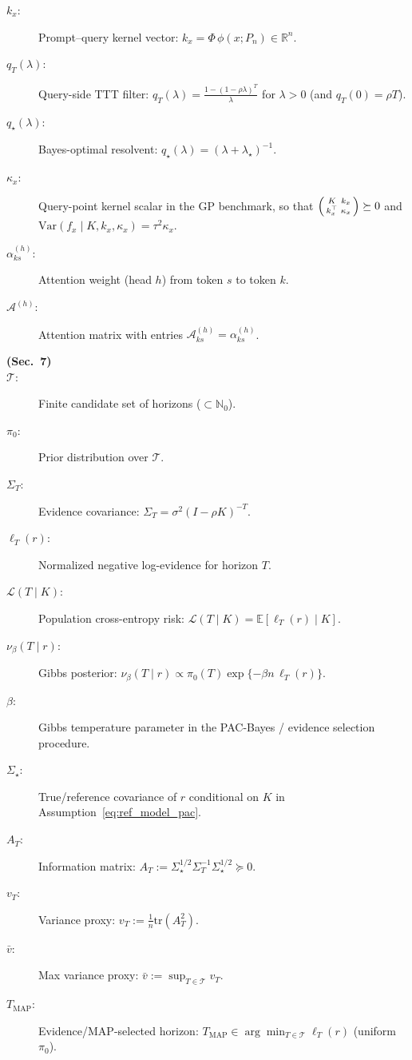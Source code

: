 \documentclass{article}
\theoremstyle{plain}
\theoremstyle{definition}
\theoremstyle{remark}
\begin{document}
\begin{description}
\item[$k_x$:] Prompt--query kernel vector: $k_x=\Phi\,\phi(x;P_n)\in\mathbb R^n$.
\item[$q_T(\lambda)$:] Query-side TTT filter:
$q_T(\lambda)=\frac{1-(1-\rho\lambda)^T}{\lambda}$ for $\lambda>0$ (and $q_T(0)=\rho T$).
\item[$q_\star(\lambda)$:] Bayes-optimal resolvent: $q_\star(\lambda)=(\lambda+\lambda_\star)^{-1}$.
\item[$\kappa_x$:] Query-point kernel scalar in the GP benchmark, so that
$\begin{psmallmatrix} K & k_x \\ k_x^\top & \kappa_x \end{psmallmatrix} \succeq 0$ and
$\mathrm{Var}(f_x\mid K,k_x,\kappa_x)=\tau^2\kappa_x$.
\item[$\alpha^{(h)}_{ks}$:] Attention weight (head $h$) from token $s$ to token $k$.
\item[$\mathcal{A}^{(h)}$:] Attention matrix with entries $\mathcal{A}^{(h)}_{ks}=\alpha^{(h)}_{ks}$.


\item[\textbf{(Sec.~7)}]
\item[$\mathcal T$:] Finite candidate set of horizons ($\subset\mathbb N_0$).
\item[$\pi_0$:] Prior distribution over $\mathcal T$.
\item[$\Sigma_T$:] Evidence covariance: $\Sigma_T=\sigma^2(I-\rho K)^{-T}$.
\item[$\ell_T(r)$:] Normalized negative log-evidence for horizon $T$.
\item[$\mathcal L(T\mid K)$:] Population cross-entropy risk: $\mathcal L(T\mid K)=\mathbb E[\ell_T(r)\mid K]$.
\item[$\nu_\beta(T\mid r)$:] Gibbs posterior:
$\nu_\beta(T\mid r)\propto \pi_0(T)\exp\{-\beta n\,\ell_T(r)\}$.
\item[$\beta$:] Gibbs temperature parameter in the PAC-Bayes / evidence selection procedure.

\item[$\Sigma_\star$:] True/reference covariance of $r$ conditional on $K$ in Assumption~\ref{eq:ref_model_pac}.
\item[$A_T$:] Information matrix:
$A_T:=\Sigma_\star^{1/2}\Sigma_T^{-1}\Sigma_\star^{1/2}\succeq 0$.
\item[$v_T$:] Variance proxy: $v_T:=\frac{1}{n}\mathrm{tr}(A_T^2)$.
\item[$\bar v$:] Max variance proxy: $\bar v:=\sup_{T\in\mathcal T} v_T$.
\item[$T_{\mathrm{MAP}}$:] Evidence/MAP-selected horizon:
$T_{\mathrm{MAP}}\in\arg\min_{T\in\mathcal T}\ell_T(r)$ (uniform $\pi_0$).



\end{description}
\end{document}
